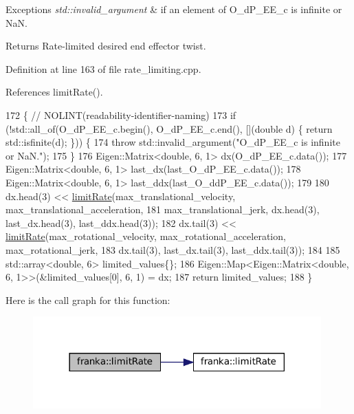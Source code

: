 \begin{DoxyExceptions}{Exceptions}
{\em std\+::invalid\+\_\+argument} & if an element of O\+\_\+d\+P\+\_\+\+E\+E\+\_\+c is infinite or NaN.\\
\hline
\end{DoxyExceptions}
\begin{DoxyReturn}{Returns}
Rate-\/limited desired end effector twist. 
\end{DoxyReturn}


Definition at line 163 of file rate\+\_\+limiting.\+cpp.



References limit\+Rate().


\begin{DoxyCode}
172                                                 \{  \textcolor{comment}{// NOLINT(readability-identifier-naming)}
173   \textcolor{keywordflow}{if} (!std::all\_of(O\_dP\_EE\_c.begin(), O\_dP\_EE\_c.end(), [](\textcolor{keywordtype}{double} d) \{ \textcolor{keywordflow}{return} std::isfinite(d); \})) \{
174     \textcolor{keywordflow}{throw} std::invalid\_argument(\textcolor{stringliteral}{"O\_dP\_EE\_c is infinite or NaN."});
175   \}
176   Eigen::Matrix<double, 6, 1> dx(O\_dP\_EE\_c.data());
177   Eigen::Matrix<double, 6, 1> last\_dx(last\_O\_dP\_EE\_c.data());
178   Eigen::Matrix<double, 6, 1> last\_ddx(last\_O\_ddP\_EE\_c.data());
179 
180   dx.head(3) << \hyperlink{namespacefranka_1_1anonymous__namespace_02rate__limiting_8cpp_03_aa1d64bbd7b303af83e6a76b92298d73a}{limitRate}(max\_translational\_velocity, max\_translational\_acceleration,
181                           max\_translational\_jerk, dx.head(3), last\_dx.head(3), last\_ddx.head(3));
182   dx.tail(3) << \hyperlink{namespacefranka_1_1anonymous__namespace_02rate__limiting_8cpp_03_aa1d64bbd7b303af83e6a76b92298d73a}{limitRate}(max\_rotational\_velocity, max\_rotational\_acceleration, 
      max\_rotational\_jerk,
183                           dx.tail(3), last\_dx.tail(3), last\_ddx.tail(3));
184 
185   std::array<double, 6> limited\_values\{\};
186   Eigen::Map<Eigen::Matrix<double, 6, 1>>(&limited\_values[0], 6, 1) = dx;
187   \textcolor{keywordflow}{return} limited\_values;
188 \}
\end{DoxyCode}
Here is the call graph for this function\+:
\nopagebreak
\begin{figure}[H]
\begin{center}
\leavevmode
\includegraphics[width=314pt]{namespacefranka_a7f2f3179adc4b960bde0a44ab1cc4fcc_cgraph}
\end{center}
\end{figure}
\mbox{\label{namespacefranka_a304bcb6a14ee8247a951f1c3cfd12711}} 
